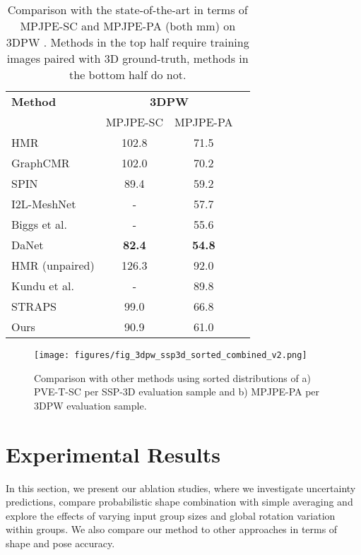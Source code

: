 \documentclass[final]{cvpr}
\begin{document}
\begin{table}[t]
\centering
\small
\begin{tabular}{l c c c} 
 \hline
 \textbf{Method} & \multicolumn{2}{c}{\textbf{3DPW}}\\
 & MPJPE-SC & MPJPE-PA\\ [0.5ex] 
 \hline
 HMR \cite{hmrKanazawa17} & 102.8 & 71.5\\
 GraphCMR \cite{kolotouros2019cmr} & 102.0 & 70.2\\
 SPIN \cite{kolotouros2019spin} & 89.4 & 59.2\\
 I2L-MeshNet \cite{Moon_2020_ECCV_I2L-MeshNet} & - & 57.7\\
 Biggs et al. \cite{biggs2020multibodies} & - & 55.6\\
 DaNet \cite{zhang2019danet} & \textbf{82.4} & \textbf{54.8}\\
 \hline
 HMR (unpaired) \cite{hmrKanazawa17} & 126.3 & 92.0\\
 Kundu et al. \cite{kundu_human_mesh} & - & 89.8\\
 STRAPS \cite{STRAPS2020BMVC} & 99.0 & 66.8\\
 Ours & 90.9 & 61.0\\
 \hline
\end{tabular}
\caption{Comparison with the state-of-the-art in terms of MPJPE-SC and MPJPE-PA (both mm) on 3DPW \cite{vonMarcard2018}. Methods in the top half require training images paired with 3D ground-truth, methods in the bottom half do not.}
\label{table:3dpw_sota_comparison}
\vspace{-0.3cm}
\end{table}

\begin{figure}[t]
    \centering
    \texttt{[image: figures/fig\_3dpw\_ssp3d\_sorted\_combined\_v2.png]}
    \caption{Comparison with other methods using sorted distributions of a) PVE-T-SC per SSP-3D evaluation sample and b) MPJPE-PA per 3DPW evaluation sample.}
    \label{fig:3dpw_ssp3d_sorted_error_distribution_combined}
    \vspace{-0cm}
\end{figure}

\section{Experimental Results}
\label{sec:experimental_results}

In this section, we present our ablation studies, where we investigate uncertainty predictions, compare probabilistic shape combination with simple averaging and explore the effects of varying input group sizes and global rotation variation within groups. We also compare our method to other approaches in terms of shape and pose accuracy.
\end{document}

